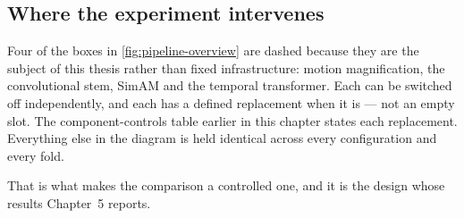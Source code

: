 \subsection{Where the experiment intervenes}
\label{sec:pipeline-intervenes}

Four of the boxes in \autoref{fig:pipeline-overview} are dashed because they
are the subject of this thesis rather than fixed infrastructure: motion
magnification, the convolutional stem, SimAM and the temporal transformer.
Each can be switched off independently, and each has a defined replacement
when it is --- not an empty slot. The component-controls table earlier in this
chapter states each replacement. Everything else in the diagram is held
identical across every configuration and every fold.

That is what makes the comparison a controlled one, and it is the design whose
results Chapter~5 reports.

